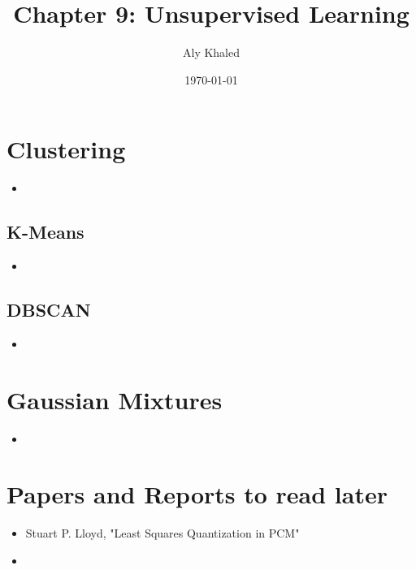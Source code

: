 \documentclass{article}
\title{Chapter 9: Unsupervised Learning}
\author{Aly Khaled}
\date{\today}
\begin{document}
 
    \maketitle
    \section{Clustering}
    \begin{itemize}
    	\item 
    \end{itemize}
    \subsection{K-Means}
    \begin{itemize}
    	\item 
    \end{itemize}
    \subsection{DBSCAN}
    \begin{itemize}
    	\item 
    \end{itemize}
    \section{Gaussian Mixtures}
    \begin{itemize}
    	\item 
	\end{itemize}								
    \section*{Papers and Reports to read later}
    \begin{itemize}
    	\item Stuart P. Lloyd, "Least Squares Quantization in PCM"
    	\item 
    \end{itemize}
\end{document}

